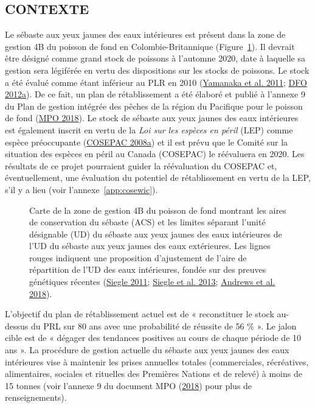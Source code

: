 \documentclass[french,11pt]{book}
\begin{document}
\hypertarget{sec:introduction-background}{%
\subsection{CONTEXTE}\label{sec:introduction-background}}

Le sébaste aux yeux jaunes des eaux intérieures est présent dans la zone de gestion 4B du poisson de fond en Colombie-Britannique (Figure~\ref{fig:map-4B}). Il devrait être désigné comme grand stock de poissons à l'automne 2020, date à laquelle sa gestion sera légiférée en vertu des dispositions sur les stocks de poissons. Le stock a été évalué comme étant inférieur au PLR en 2010 (\protect\hyperlink{ref-yamanaka2011}{Yamanaka et al. 2011}; \protect\hyperlink{ref-dfo2012}{DFO 2012a}). De ce fait, un plan de rétablissement a été élaboré et publié à l'annexe 9 du Plan de gestion intégrée des pêches de la région du Pacifique pour le poisson de fond (\protect\hyperlink{ref-ifmp2018}{MPO 2018}). Le stock de sébaste aux yeux jaunes des eaux intérieures est également inscrit en vertu de la \emph{Loi sur les espèces en péril} (LEP) comme espèce préoccupante (\protect\hyperlink{ref-cosewic2008}{COSEPAC 2008a}) et il est prévu que le Comité sur la situation des espèces en péril au Canada (COSEPAC) le réévaluera en 2020. Les résultats de ce projet pourraient guider la réévaluation du COSEPAC et, éventuellement, une évaluation du potentiel de rétablissement en vertu de la LEP, s'il y a lieu (voir l'annexe~\ref{app:cosewic}).


\begin{figure}[htb]

{\centering {} 

}

\caption{Carte de la zone de gestion 4B du poisson de fond montrant les aires de conservation du sébaste (ACS) et les limites séparant l'unité désignable (UD) du sébaste aux yeux jaunes des eaux intérieures de l'UD du sébaste aux yeux jaunes des eaux extérieures. Les lignes rouges indiquent une proposition d'ajustement de l'aire de répartition de l'UD des eaux intérieures, fondée sur des preuves génétiques récentes (\protect\hyperlink{ref-siegle2011}{Siegle 2011}; \protect\hyperlink{ref-siegle2013}{Siegle et al. 2013}; \protect\hyperlink{ref-andrews2018}{Andrews et al. 2018}).}\label{fig:map-4B}
\end{figure}
L'objectif du plan de rétablissement actuel est de « reconstituer le stock au-dessus du PRL sur 80 ans avec une probabilité de réussite de 56 \% ». Le jalon cible est de « dégager des tendances positives au cours de chaque période de 10 ans ». La procédure de gestion actuelle du sébaste aux yeux jaunes des eaux intérieures vise à maintenir les prises annuelles totales (commerciales, récréatives, alimentaires, sociales et rituelles des Premières Nations et de relevé) à moins de 15 tonnes (voir l'annexe 9 du document MPO (\protect\hyperlink{ref-ifmp2018}{2018}) pour plus de renseignements).
\end{document}
